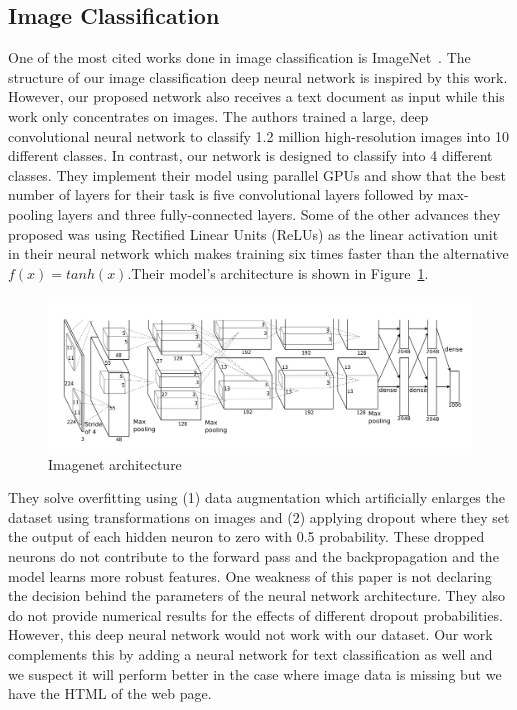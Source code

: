 \documentclass{article} %
\begin{document}
\subsection{Image Classification}
One of the most cited works done in image classification is ImageNet~\cite{imagehinton}. The structure of our image classification deep neural network is inspired by this work. However, our proposed network also receives a text document as input while this work only concentrates on images.
The authors trained a large, deep convolutional neural network to classify 1.2 million high-resolution images into 10 different classes. In contrast, our network is designed to classify into 4 different classes.
They implement their model using parallel GPUs and show that the best number of layers for their task is five convolutional layers followed by max-pooling layers and three fully-connected layers. Some of the other advances they proposed was using Rectified Linear Units (ReLUs) as the linear activation unit in their neural network which makes training six times faster than the alternative $f(x) = tanh(x)$.Their model's architecture is shown in Figure~\ref{fig:imagenet}.
\begin{figure}
\centering
        \includegraphics[totalheight=5cm]{imagenet}
    \caption{Imagenet architecture \protect\cite{imagehinton}}
    \label{fig:imagenet}
\end{figure}
They solve overfitting using (1) data augmentation which artificially enlarges the dataset using transformations on images and (2) applying dropout where they set the output of each hidden neuron to zero with 0.5 probability. These dropped neurons do not contribute to the forward pass and the backpropagation and the model learns more robust features.
One weakness of this paper is not declaring the decision behind the parameters of the neural network architecture. They also do not provide numerical results for the effects of different dropout probabilities. However, this deep neural network would not work with our dataset. Our work complements this by adding a neural network for text classification as well and we suspect it will perform better in the case where image data is missing but we have the HTML of the web page.
\end{document}
